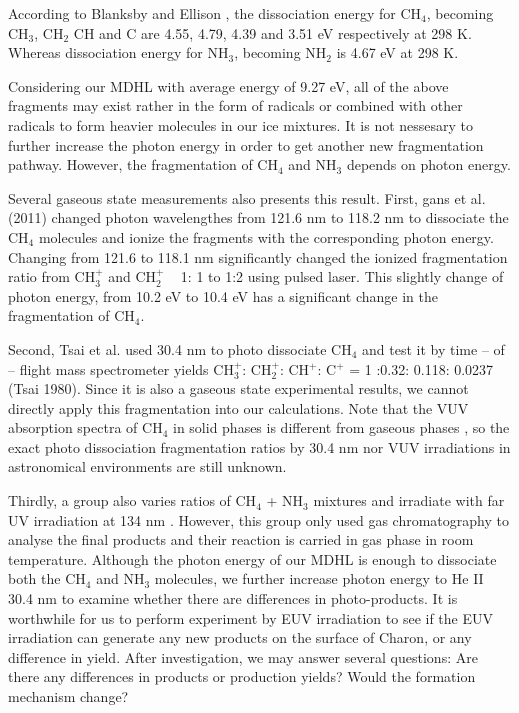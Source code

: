 According to Blanksby and Ellison \cite{blanksby2003bond}, the dissociation energy for CH$_4$, becoming CH$_3$, CH$_2$ CH and C are 4.55, 4.79, 4.39 and 3.51 eV respectively at 298 K. Whereas dissociation energy for NH$_3$, becoming NH$_2$ is 4.67 eV at 298 K.

Considering our MDHL with average energy of 9.27 eV, all of the above fragments may exist rather in the form of radicals or combined with other radicals to form heavier molecules in our ice mixtures. It is not nessesary to further increase the photon energy in order to get another new fragmentation pathway. However, the fragmentation of CH$_4$ and NH$_3$ depends on photon energy.

Several gaseous state measurements also presents this result. First, gans et al. (2011) \cite{gans2011photolysis} changed photon wavelengthes from 121.6 nm to 118.2 nm to dissociate the CH$_4$ molecules and ionize the fragments with the corresponding photon energy. Changing from 121.6 to 118.1 nm significantly changed the ionized fragmentation ratio from CH$_3^+$ and CH$_2^+$ ~ 1: 1 to 1:2 using pulsed laser. This slightly change of photon energy, from 10.2 eV to 10.4 eV has a significant change in the fragmentation of CH$_4$.

Second, Tsai et al. \cite{tsai1980mass} used 30.4 nm to photo dissociate CH$_4$ and test it by time – of – flight mass spectrometer yields CH$_3^+$: CH$_2^+$: CH$^+$: C$^+$ = 1 :0.32: 0.118: 0.0237 (Tsai 1980). Since it is also a gaseous state experimental results, we cannot directly apply this fragmentation into our calculations. Note that the VUV absorption spectra of CH$_4$ in solid phases is different from gaseous phases \cite{cruz2014vacuum}, so the exact photo dissociation fragmentation ratios by 30.4 nm nor VUV irradiations in astronomical environments are still unknown.

Thirdly, a group also varies ratios of CH$_4$ + NH$_3$ mixtures and irradiate with far UV irradiation at 134 nm \cite{bossard1980far}. However, this group only used gas chromatography to analyse the final products and their reaction is carried in gas phase in room temperature. Although the photon energy of our MDHL is enough to dissociate both the CH$_4$ and NH$_3$ molecules, we further increase photon energy to He II 30.4 nm to examine whether there are differences in photo-products. It is worthwhile for us to perform experiment by EUV irradiation to see if the EUV irradiation can generate any new products on the surface of Charon, or any difference in yield. After investigation, we may answer several questions: Are there any differences in products or production yields? Would the formation mechanism change?

